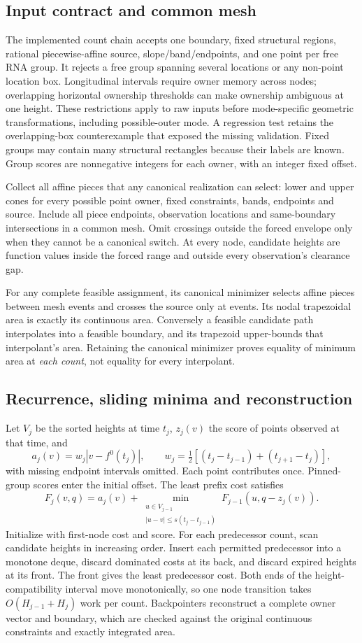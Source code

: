 \documentclass[10pt,letterpaper]{article}
\begin{document}
\subsection{Input contract and common mesh}
The implemented count chain accepts one boundary, fixed structural regions, rational piecewise-affine source, slope/band/endpoints, and one point per free RNA group. It rejects a free group spanning several locations or any non-point location box. Longitudinal intervals require owner memory across nodes; overlapping horizontal ownership thresholds can make ownership ambiguous at one height. These restrictions apply to raw inputs before mode-specific geometric transformations, including possible-outer mode. A regression test retains the overlapping-box counterexample that exposed the missing validation. Fixed groups may contain many structural rectangles because their labels are known. Group scores are nonnegative integers for each owner, with an integer fixed offset.

Collect all affine pieces that any canonical realization can select: lower and upper cones for every possible point owner, fixed constraints, bands, endpoints and source. Include all piece endpoints, observation locations and same-boundary intersections in a common mesh. Omit crossings outside the forced envelope only when they cannot be a canonical switch. At every node, candidate heights are function values inside the forced range and outside every observation's clearance gap.

For any complete feasible assignment, its canonical minimizer selects affine pieces between mesh events and crosses the source only at events. Its nodal trapezoidal area is exactly its continuous area. Conversely a feasible candidate path interpolates into a feasible boundary, and its trapezoid upper-bounds that interpolant's area. Retaining the canonical minimizer proves equality of minimum area at \emph{each count}, not equality for every interpolant.

\subsection{Recurrence, sliding minima and reconstruction}
Let $V_j$ be the sorted heights at time $t_j$, $z_j(v)$ the score of points observed at that time, and
\[
 a_j(v)=w_j|v-f^0(t_j)|,\qquad
 w_j=\tfrac12[(t_j-t_{j-1})+(t_{j+1}-t_j)],
\]
with missing endpoint intervals omitted. Each point contributes once. Pinned-group scores enter the initial offset. The least prefix cost satisfies
\[
 F_j(v,q)=a_j(v)+
 \min_{\substack{u\in V_{j-1}\\|u-v|\le s(t_j-t_{j-1})}}
 F_{j-1}(u,q-z_j(v)).
\]
Initialize with first-node cost and score. For each predecessor count, scan candidate heights in increasing order. Insert each permitted predecessor into a monotone deque, discard dominated costs at its back, and discard expired heights at its front. The front gives the least predecessor cost. Both ends of the height-compatibility interval move monotonically, so one node transition takes $O(H_{j-1}+H_j)$ work per count. Backpointers reconstruct a complete owner vector and boundary, which are checked against the original continuous constraints and exactly integrated area.
\end{document}
